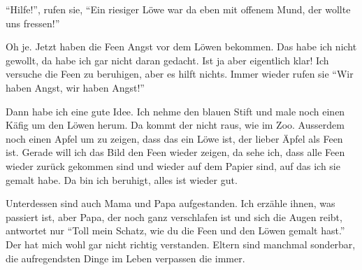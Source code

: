 \enquote{Hilfe!}, rufen sie, \enquote{Ein riesiger Löwe war da eben mit offenem Mund, der wollte uns fressen!}

Oh je. Jetzt haben die Feen Angst vor dem Löwen bekommen. Das habe ich nicht gewollt, da habe ich gar nicht daran gedacht. Ist ja aber eigentlich klar! Ich versuche die Feen zu beruhigen, aber es hilft nichts. Immer wieder rufen sie \enquote{Wir haben Angst, wir haben Angst!}

Dann habe ich eine gute Idee. Ich nehme den blauen Stift und male noch einen Käfig um den Löwen herum. Da kommt der nicht raus, wie im Zoo. Ausserdem noch einen Apfel um zu zeigen, dass das ein Löwe ist, der lieber Äpfel als Feen ist. Gerade will ich das Bild den Feen wieder zeigen, da sehe ich, dass alle Feen wieder zurück gekommen sind und wieder auf dem Papier sind, auf das ich sie gemalt habe. Da bin ich beruhigt, alles ist wieder gut.

Unterdessen sind auch Mama und Papa aufgestanden. Ich erzähle ihnen, was passiert ist, aber Papa, der noch ganz verschlafen ist und sich die Augen reibt, antwortet nur \enquote{Toll mein Schatz, wie du die Feen und den Löwen gemalt hast.} Der hat mich wohl gar nicht richtig verstanden. Eltern sind manchmal sonderbar, die aufregendsten Dinge im Leben verpassen die immer.  \hfill {\color{red}\decofourleft}
